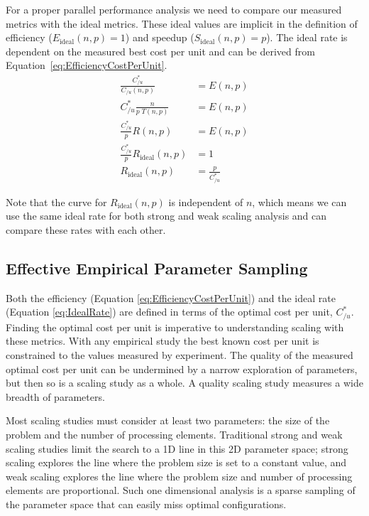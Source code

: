 \documentclass[conference]{IEEEtran}
\begin{document}
For a proper parallel performance analysis we need to compare our measured
metrics with the ideal metrics. These ideal values are implicit in the
definition of efficiency ($E_\mathrm{ideal}(n,p) = 1$) and speedup
($S_\mathrm{ideal}(n,p) = p$). The ideal rate is dependent on the measured
best cost per unit and can be derived from
Equation~\ref{eq:EfficiencyCostPerUnit}.
\begingroup
\addtolength{\jot}{1ex} %
\begin{align}
  \frac{C_{/u}^*}{C_{/u}(n,p)} &= E(n,p) \nonumber \\
  C_{/u}^* \frac{n}{p \; T(n,p)} &= E(n,p) \nonumber \\
  \frac{C_{/u}^*}{p} R(n,p) &= E(n,p) \nonumber \\
  \frac{C_{/u}^*}{p} R_\mathrm{ideal}(n,p) &= 1 \nonumber \\
  R_\mathrm{ideal}(n,p) &= \frac{p}{C_{/u}^*}
  \label{eq:IdealRate}
\end{align}
\endgroup

Note that the curve for $R_\mathrm{ideal}(n,p)$ is independent of $n$,
which means we can use the same ideal rate for both strong and weak scaling
analysis and can compare these rates with each other.

\subsection{Effective Empirical Parameter Sampling}

Both the efficiency (Equation \ref{eq:EfficiencyCostPerUnit}) and the ideal
rate (Equation \ref{eq:IdealRate}) are defined in terms of the optimal cost
per unit, $C_{/u}^*$. Finding the optimal cost per unit is imperative to
understanding scaling with these metrics. With any empirical study the best
known cost per unit is constrained to the values measured by experiment.
The quality of the measured optimal cost per unit can be undermined by a
narrow exploration of parameters, but then so is a scaling study as a
whole. A quality scaling study measures a wide breadth of parameters.

Most scaling studies must consider at least two parameters: the size of the
problem and the number of processing elements. Traditional strong and
weak scaling studies limit the search to a 1D line in this 2D parameter
space; strong scaling explores the line where the problem size is set to a
constant value, and weak scaling explores the line where the problem size
and number of processing elements are proportional. Such one dimensional
analysis is a sparse sampling of the parameter space that can easily miss
optimal configurations.
\end{document}
